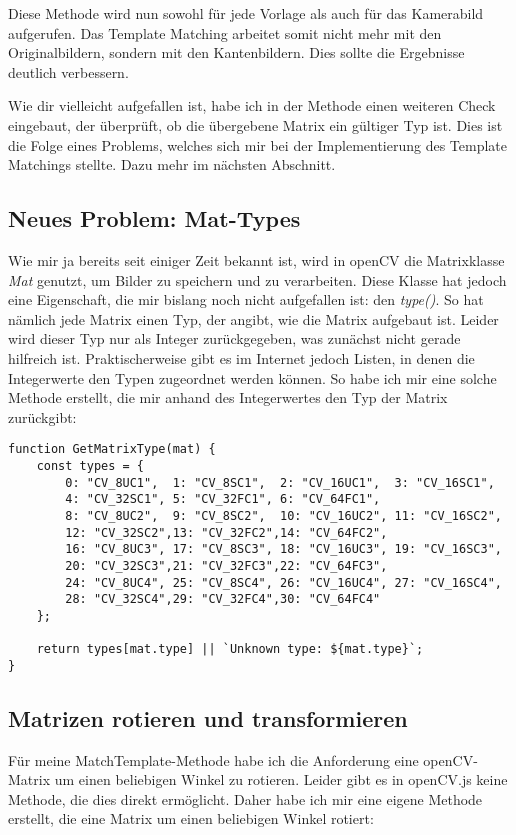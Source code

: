 Diese Methode wird nun sowohl für jede Vorlage als auch für das Kamerabild aufgerufen. Das Template Matching arbeitet somit nicht mehr mit den Originalbildern, sondern mit den Kantenbildern. Dies sollte die Ergebnisse deutlich verbessern.

Wie dir vielleicht aufgefallen ist, habe ich in der Methode einen weiteren Check eingebaut, der überprüft, ob die übergebene Matrix ein gültiger Typ ist. Dies ist die Folge eines Problems, welches sich mir bei der Implementierung des Template Matchings stellte. Dazu mehr im nächsten Abschnitt.

\subsection{Neues Problem: Mat-Types}
Wie mir ja bereits seit einiger Zeit bekannt ist, wird in openCV die Matrixklasse \textit{Mat} genutzt, um Bilder zu speichern und zu verarbeiten. Diese Klasse hat jedoch eine Eigenschaft, die mir bislang noch nicht aufgefallen ist: den \textit{type()}. So hat nämlich jede Matrix einen Typ, der angibt, wie die Matrix aufgebaut ist. Leider wird dieser Typ nur als Integer zurückgegeben, was zunächst nicht gerade hilfreich ist. Praktischerweise gibt es im Internet jedoch Listen, in denen die Integerwerte den Typen zugeordnet werden können. So habe ich mir eine solche Methode erstellt, die mir anhand des Integerwertes den Typ der Matrix zurückgibt:

\begin{lstlisting}[style=JavaScript]
function GetMatrixType(mat) {
    const types = {
        0: "CV_8UC1",  1: "CV_8SC1",  2: "CV_16UC1",  3: "CV_16SC1",
        4: "CV_32SC1", 5: "CV_32FC1", 6: "CV_64FC1",
        8: "CV_8UC2",  9: "CV_8SC2",  10: "CV_16UC2", 11: "CV_16SC2",
        12: "CV_32SC2",13: "CV_32FC2",14: "CV_64FC2",
        16: "CV_8UC3", 17: "CV_8SC3", 18: "CV_16UC3", 19: "CV_16SC3",
        20: "CV_32SC3",21: "CV_32FC3",22: "CV_64FC3",
        24: "CV_8UC4", 25: "CV_8SC4", 26: "CV_16UC4", 27: "CV_16SC4",
        28: "CV_32SC4",29: "CV_32FC4",30: "CV_64FC4"
    };
    
    return types[mat.type] || `Unknown type: ${mat.type}`;
}
\end{lstlisting}

\subsection{Matrizen rotieren und transformieren}
Für meine MatchTemplate-Methode habe ich die Anforderung eine openCV-Matrix um einen beliebigen Winkel zu rotieren. Leider gibt es in openCV.js keine Methode, die dies direkt ermöglicht. Daher habe ich mir eine eigene Methode erstellt, die eine Matrix um einen beliebigen Winkel rotiert:

